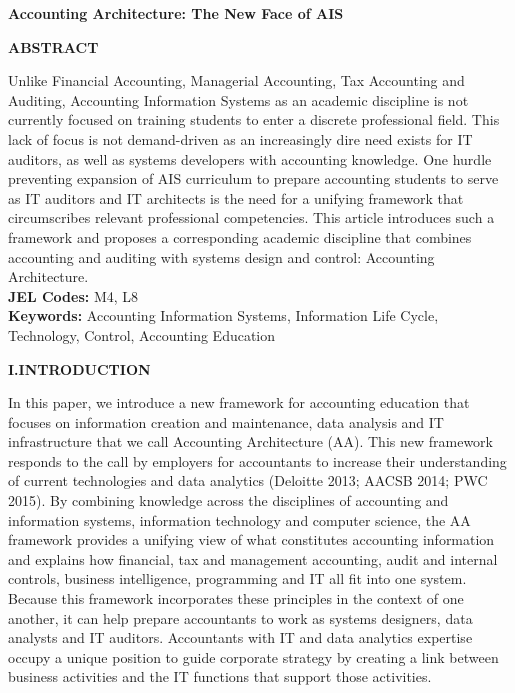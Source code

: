 \documentclass[12pt]{article}
\newcommand{\Abstract}[0]{\centerline{\textbf{\MakeUppercase{Abstract}}}\medskip{}}
\newcommand{\Section}[2]{\vspace{.2in}\centerline{\normalsize{}\textbf{#1\quad{}\MakeUppercase{#2}}}\nopagebreak{}\smallskip{}\indent{}}
\begin{document}
\doublespace{}
\thispagestyle{empty}
{\centerline{\large{}\textbf{Accounting Architecture: The New Face of AIS}}}\vspace{.1in}
\Abstract{}
Unlike Financial Accounting, Managerial Accounting, Tax Accounting and Auditing, Accounting Information Systems as an academic discipline is not currently focused on training students to enter a discrete professional field. This lack of focus is not demand-driven as an increasingly dire need exists for IT auditors, as well as systems developers with accounting knowledge. One hurdle preventing expansion of AIS curriculum to prepare accounting students to serve as IT auditors and IT architects is the need for a unifying framework that circumscribes relevant professional competencies. This article introduces such a framework and proposes a corresponding academic discipline that combines accounting and auditing with systems design and control: Accounting Architecture.\\[.2in]
\textbf{JEL Codes:} M4, L8\\[.1in]
\textbf{Keywords:} Accounting Information Systems, Information Life Cycle, Technology, Control, Accounting Education\\[.2in]
\newpage{}
\setcounter{page}{1}

\Section{I.}{Introduction}
In this paper, we introduce a new framework for accounting education that focuses on information creation and maintenance, data analysis and IT infrastructure that we call Accounting Architecture (AA). This new framework responds to the call by employers for accountants to increase their understanding of current technologies and data analytics (Deloitte 2013; AACSB 2014; PWC 2015). By combining knowledge across the disciplines of accounting and information systems, information technology and computer science, the AA framework provides a unifying view of what constitutes accounting information and explains how financial, tax and management accounting, audit and internal controls, business intelligence, programming and IT all fit into one system. Because this framework incorporates these principles in the context of one another, it can help prepare accountants to work as systems designers, data analysts and IT auditors. Accountants with IT and data analytics expertise occupy a unique position to guide corporate strategy by creating a link between business activities and the IT functions that support those activities.
\end{document}
